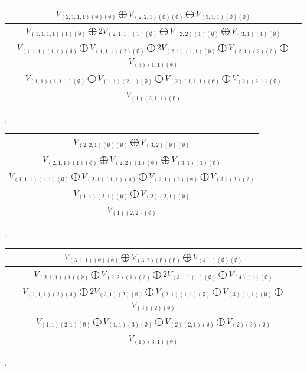 \documentclass[letterpaper,11pt]{article}
\begin{document}
	\begin{tabular}{| c |}
		\hline
		$V_{(2,1,1,1)(\emptyset)(\emptyset)}$$\bigoplus$$V_{(2,2,1)(\emptyset)(\emptyset)}$$\bigoplus$$V_{(3,1,1)(\emptyset)(\emptyset)}$\\
		\hline
		$V_{(1,1,1,1)(1)(\emptyset)}$$\bigoplus$2$V_{(2,1,1)(1)(\emptyset)}$$\bigoplus$$V_{(2,2)(1)(\emptyset)}$$\bigoplus$$V_{(3,1)(1)(\emptyset)}$\\
		\hline
		$V_{(1,1,1)(1,1)(\emptyset)}$$\bigoplus$$V_{(1,1,1)(2)(\emptyset)}$$\bigoplus$2$V_{(2,1)(1,1)(\emptyset)}$$\bigoplus$$V_{(2,1)(2)(\emptyset)}$$\bigoplus$$V_{(3)(1,1)(\emptyset)}$\\
		\hline
		$V_{(1,1)(1,1,1)(\emptyset)}$$\bigoplus$$V_{(1,1)(2,1)(\emptyset)}$$\bigoplus$$V_{(2)(1,1,1)(\emptyset)}$$\bigoplus$$V_{(2)(2,1)(\emptyset)}$\\
		\hline
		$V_{(1)(2,1,1)(\emptyset)}$\\
		\hline
	\end{tabular}, 
	\newline 
	\begin{tabular}{| c |}
		\hline
		$V_{(2,2,1)(\emptyset)(\emptyset)}$$\bigoplus$$V_{(3,2)(\emptyset)(\emptyset)}$\\
		\hline
		$V_{(2,1,1)(1)(\emptyset)}$$\bigoplus$$V_{(2,2)(1)(\emptyset)}$$\bigoplus$$V_{(3,1)(1)(\emptyset)}$\\
		\hline
		$V_{(1,1,1)(1,1)(\emptyset)}$$\bigoplus$$V_{(2,1)(1,1)(\emptyset)}$$\bigoplus$$V_{(2,1)(2)(\emptyset)}$$\bigoplus$$V_{(3)(2)(\emptyset)}$\\
		\hline
		$V_{(1,1)(2,1)(\emptyset)}$$\bigoplus$$V_{(2)(2,1)(\emptyset)}$\\
		\hline
		$V_{(1)(2,2)(\emptyset)}$\\
		\hline
	\end{tabular}, 
	\newline 
	\begin{tabular}{| c |}
		\hline
		$V_{(3,1,1)(\emptyset)(\emptyset)}$$\bigoplus$$V_{(3,2)(\emptyset)(\emptyset)}$$\bigoplus$$V_{(4,1)(\emptyset)(\emptyset)}$\\
		\hline
		$V_{(2,1,1)(1)(\emptyset)}$$\bigoplus$$V_{(2,2)(1)(\emptyset)}$$\bigoplus$2$V_{(3,1)(1)(\emptyset)}$$\bigoplus$$V_{(4)(1)(\emptyset)}$\\
		\hline
		$V_{(1,1,1)(2)(\emptyset)}$$\bigoplus$2$V_{(2,1)(2)(\emptyset)}$$\bigoplus$$V_{(2,1)(1,1)(\emptyset)}$$\bigoplus$$V_{(3)(1,1)(\emptyset)}$$\bigoplus$$V_{(3)(2)(\emptyset)}$\\
		\hline
		$V_{(1,1)(2,1)(\emptyset)}$$\bigoplus$$V_{(1,1)(3)(\emptyset)}$$\bigoplus$$V_{(2)(2,1)(\emptyset)}$$\bigoplus$$V_{(2)(3)(\emptyset)}$\\
		\hline
		$V_{(1)(3,1)(\emptyset)}$\\
		\hline
	\end{tabular}, 
\end{document}
